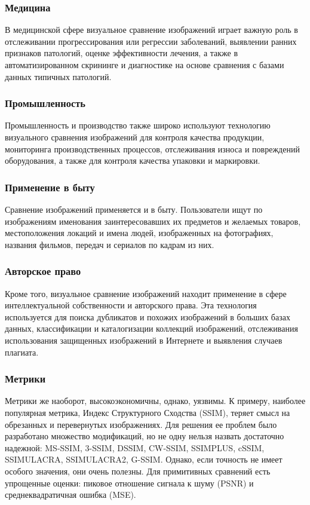 \documentclass[variant=courcework]{bsuir}
\begin{document}
\subsubsection{Медицина}
В медицинской сфере визуальное сравнение изображений играет важную роль в
отслеживании прогрессирования или регрессии заболеваний, выявлении ранних
признаков патологий, оценке эффективности лечения, а также в автоматизированном
скрининге и диагностике на основе сравнения с базами данных типичных патологий.

\subsubsection{Промышленность}
Промышленность и производство также широко используют технологию визуального
сравнения изображений для контроля качества продукции, мониторинга
производственных процессов, отслеживания износа и повреждений оборудования, а
также для контроля качества упаковки и маркировки.

\subsubsection{Применение в быту}
Сравнение изображений применяется и в быту. Пользователи ищут по изображениям
именования заинтересовавших их предметов и желаемых товаров, местоположения
локаций и имена людей, изображенных на фотографиях, названия фильмов, передач и
сериалов по кадрам из них.

\subsubsection{Авторское право}
Кроме того, визуальное сравнение изображений находит применение в сфере
интеллектуальной собственности и авторского права. Эта технология используется
для поиска дубликатов и похожих изображений в больших базах данных,
классификации и каталогизации коллекций изображений, отслеживания использования
защищенных изображений в Интернете и выявления случаев плагиата.

\subsubsection{Метрики}
Метрики же наоборот, высокоэкономичны, однако, уязвимы. К примеру, наиболее
популярная метрика, Индекс Структурного Сходства (SSIM), теряет смысл на
обрезанных и перевернутых изображениях. Для решения ее проблем было разработано
множество модификаций, но не одну нельзя назвать достаточно надежной: MS-SSIM,
3-SSIM, DSSIM, CW-SSIM, SSIMPLUS, cSSIM, SSIMULACRA, SSIMULACRA2, G-SSIM.
Однако, если точность не имеет особого значения, они очень полезны. Для
примитивных сравнений есть упрощенные оценки: пиковое отношение сигнала к шуму
(PSNR) и среднеквадратичная ошибка (MSE).
\end{document}

